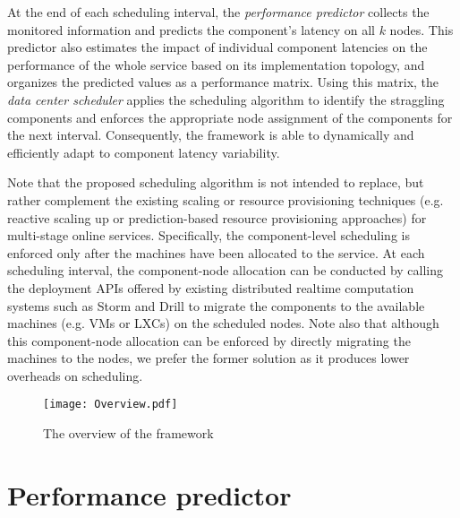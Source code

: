 \documentclass[10pt, conference, compsocconf]{IEEEtran}
\begin{document}
At the end of each scheduling interval, the \emph{performance predictor} collects the monitored information and predicts the component's latency on all $k$ nodes. This predictor also estimates the impact of individual component latencies on the performance of the whole service based on its implementation topology, and organizes the predicted values as a performance matrix. Using this matrix, the \emph{data center scheduler} applies the scheduling algorithm to identify the straggling components and enforces the appropriate node assignment of the components for the next interval. Consequently, the framework is able to dynamically and efficiently adapt to component latency variability.

Note that the proposed scheduling algorithm is not intended to replace, but rather complement the existing scaling or resource provisioning techniques (e.g. reactive scaling up \cite{han2012lightweight} or prediction-based resource provisioning \cite{calheiros2011virtual,han2014enabling} approaches) for multi-stage online services. Specifically, the component-level scheduling is enforced only after the machines have been allocated to the service. At each scheduling interval, the component-node allocation can be conducted by calling the deployment APIs offered by existing distributed realtime computation systems such as Storm \cite{StormWebsite} and Drill \cite{DrillWebsite} to migrate the components to the available machines (e.g. VMs or LXCs) on the scheduled nodes. Note also that although this component-node allocation can be enforced by directly migrating the machines to the nodes, we prefer the former solution as it produces lower overheads on scheduling.



\begin{figure}
\centering
  \texttt{[image: Overview.pdf]}\\
  \caption{The overview of the framework}
  \label{Fig: Overview}
\end{figure}

\section{Performance predictor} \label{Section: Performance predictor}
\end{document}
